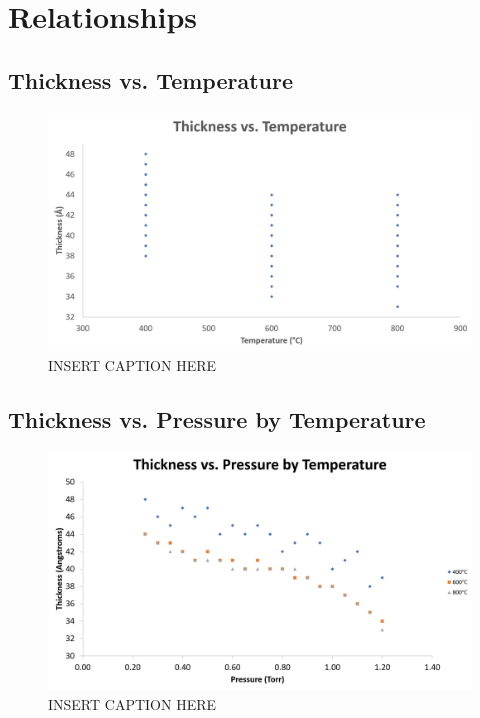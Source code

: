 \documentclass[letterpaper]{article}
\begin{document}
\section{Relationships}

\subsection{Thickness vs. Temperature}

\begin{figure}[H]
 \centering
 \includegraphics[width=\textwidth]{thiccvstemp.png}
 \caption{INSERT CAPTION HERE}
 \label{thiccvstemp}
\end{figure}

\subsection{Thickness vs. Pressure by Temperature}

\begin{figure}[H]
 \centering
 \includegraphics[width=\textwidth]{thiccvspressurebytemp.png}
 \caption{INSERT CAPTION HERE}
 \label{thiccvspressurebytemp}
\end{figure}
\end{document}
